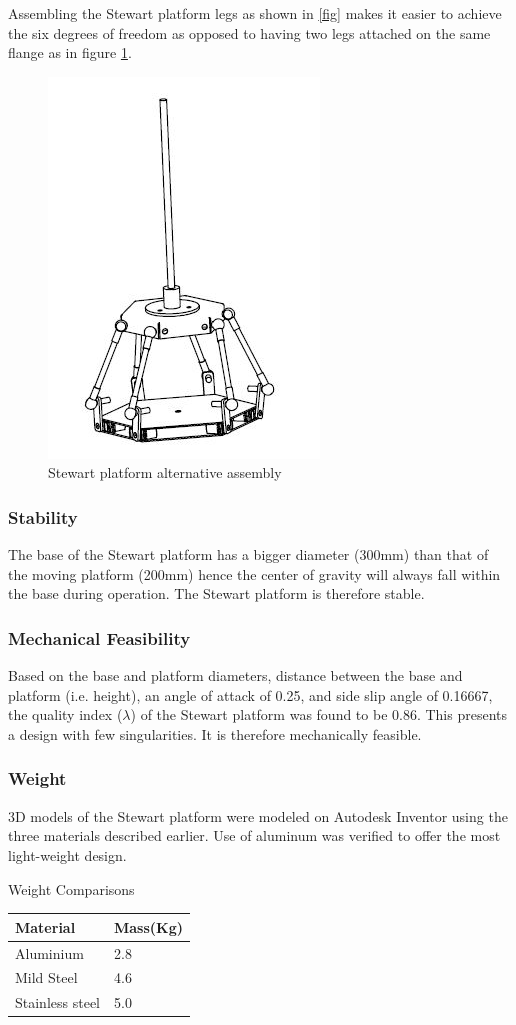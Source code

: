 Assembling the Stewart platform legs as shown in \ref{fig} makes it easier to achieve the six degrees of freedom as opposed to having two legs attached on the same flange as in figure \ref{fig2}.
\begin{center}
\begin{figure}[H]
\centering
\includegraphics[width=0.3\linewidth]{Figures/assembly2}
\caption[Stewart platform assembly]{Stewart platform alternative assembly}
\label{fig2}
\end{figure}
\end{center}
\subsubsection{Stability}
The base of the Stewart platform has a bigger diameter (300mm) than that of the moving platform (200mm) hence the center of gravity will always fall within the base during operation. The Stewart platform is therefore stable.
\subsubsection{Mechanical Feasibility}
Based on the base and platform diameters, distance between the base and platform (i.e. height), an angle of attack of 0.25, and side slip angle of 0.16667, the quality index ($\lambda$) of the Stewart platform was found to be 0.86. This presents a design with few singularities. It is therefore mechanically feasible.
\subsubsection{Weight}
3D models of the Stewart platform were modeled on Autodesk Inventor using the three materials described earlier. Use of aluminum was verified to offer the most light-weight design.
\begin{table}[H]
\caption{Weight Comparisons}
\end{table}
\begin{center}
\begin{tabular}{|l|l|}
\hline
\textbf{Material} & \textbf{Mass(Kg)}\\
\hline
Aluminium & 2.8\\
\hline
Mild Steel & 4.6\\
\hline
Stainless steel & 5.0 \\
\hline
\end{tabular}
\end{center}
